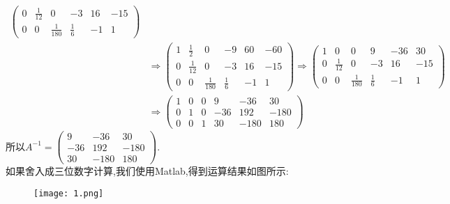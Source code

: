 ﻿\documentclass{book} \usepackage{exsheets} \usepackage{xeCJK}
\begin{document}
\begin{solution}
\begin{align*}
\begin{pmatrix}
                                                                                                                     0&\frac{1}{12}&0&-3&16&-15\\
                                                                                                                     0&0&\frac{1}{180}&\frac{1}{6}&-1&1 \end{pmatrix}\\&\Rightarrow
                                                                                                                                                                         \begin{pmatrix}
                                                                                                                                                                           1&\frac{1}{2}&0&-9&60&-60\\
0&\frac{1}{12}&0&-3&16&-15\\
0&0&\frac{1}{180}&\frac{1}{6}&-1&1
                                                                                                                                                                         \end{pmatrix}\Rightarrow
                                  \begin{pmatrix}
                                    1&0&0&9&-36&30\\
0&\frac{1}{12}&0&-3&16&-15\\
0&0&\frac{1}{180}&\frac{1}{6}&-1&1
                                  \end{pmatrix}\\&\Rightarrow
                                                   \begin{pmatrix}
                                                     1&0&0&9&-36&30\\
0&1&0&-36&192&-180\\
0&0&1&30&-180&180
                                                   \end{pmatrix}
  \end{align*}
所以$A^{-1}=
\begin{pmatrix}
  9&-36&30\\
-36&192&-180\\
30&-180&180
\end{pmatrix}
$.\\
如果舍入成三位数字计算,我们使用Matlab,得到运算结果如图所示:
\begin{figure}[h]
  \centering
  \texttt{[image: 1.png]}
  \caption{ }
  \label{fig:1.5.11}
\end{figure}
\end{solution}
\end{document}
